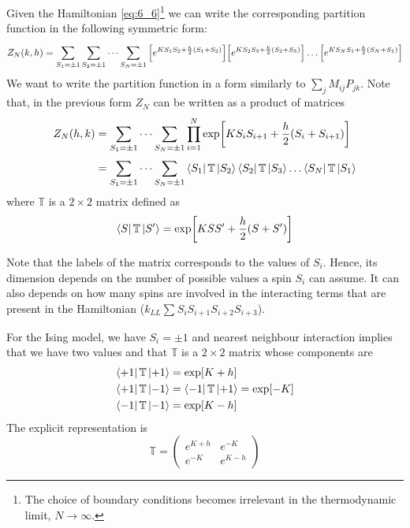 \documentclass[../../Main/Main.tex]{subfiles}
\begin{document}
Given the Hamiltonian \eqref{eq:6_6}\footnote{The choice of boundary conditions becomes irrelevant in the thermodynamic limit, \( N \rightarrow \infty  \).} we can write the corresponding partition function in the following symmetric form:
\begin{equation*}
  Z_N (k,h) = \sum_{S_1 = \pm 1}^{} \sum_{S_2 = \pm 1}^{}  \dots \sum_{S_N = \pm 1}^{}
  \qty[e^{K S_1 S_2 + \frac{h}{2}(S_1+S_2)} ] \qty[e^{K S_2 S_3 + \frac{h}{2}(S_2+S_3)} ] \dots \qty[e^{K S_N S_1 + \frac{h}{2}(S_N+S_1)} ]
\end{equation*}
We want to write the partition function in a form similarly to \( \sum_{j}^{}  M_{ij} P_{jk} \).
Note that, in the previous form \( Z_N \) can be written as a product of matrices
\begin{equation}
\begin{split}
Z_N (h,k)  &= \sum_{S_1 = \pm 1}^{} \dots \sum_{S_N = \pm 1}^{} \prod_{i=1}^{N} \exp [K S_i S_{i+1} + \frac{h}{2} (S_i + S_{i+1})] \\
& =  \sum_{S_1 = \pm 1}^{} \dots \sum_{S_N = \pm 1}^{} \bra{S_1} \mathbb{T} \ket{S_2} \bra{S_2}  \mathbb{T} \ket{S_3} \dots \bra{S_N}  \mathbb{T} \ket{S_1}
\end{split}
\end{equation}
where \( \mathbb{T} \) is a \( 2 \times 2 \)  matrix defined as
\begin{equation}
  \bra{S} \mathbb{T} \ket{S'} = \exp [K S S' + \frac{h}{2} (S+S')]
\end{equation}
\begin{remark}
  Note that the labels of the matrix corresponds to the values of \( S_i \). Hence, its dimension depends on the number of possible values a spin \( S_i \) can assume.
  It can also depends on how many spins are involved in the interacting terms that are present in the Hamiltonian (\( k_{LL} \sum_{}^{} S_i S_{i+1} S_{i+2} S_{i+3}  \)).
\end{remark}
 For the Ising model, we have \( S_i = \pm 1 \) and nearest neighbour interaction implies that we have two values and that \( \mathbb{T} \) is a \( 2 \times 2 \) matrix whose components are
\begin{align}
  \bra{+1} \mathbb{T} \ket{+1} &= \exp [K+h]  \\
    \bra{+1} \mathbb{T} \ket{-1} &=   \bra{-1} \mathbb{T} \ket{+1} = \exp [-K] \\
      \bra{-1} \mathbb{T} \ket{-1} &=\exp [K-h] 
\end{align}
The explicit representation is
\begin{equation}
  \mathbb{T} =
\begin{pmatrix}
e^{K+h}    & e^{-K}  \\
  e^{-K}  & e^{K-h}
\end{pmatrix}
\end{equation}
\end{document}
